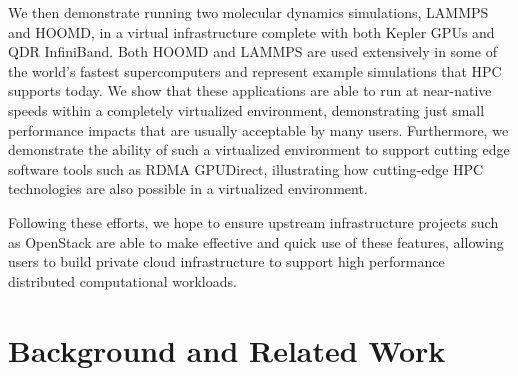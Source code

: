 We then demonstrate running two molecular dynamics simulations, LAMMPS and HOOMD, in a virtual infrastructure complete with both Kepler GPUs and QDR InfiniBand.  Both HOOMD and LAMMPS are used extensively in some of the world's fastest supercomputers and represent example simulations that HPC supports today.  We show that these applications are able to run at near-native speeds within a completely virtualized environment, demonstrating just small performance impacts that are usually acceptable by many users. Furthermore, we demonstrate the ability of such a virtualized environment to support cutting edge software tools such as RDMA GPUDirect, illustrating how cutting-edge HPC technologies are also possible in a virtualized environment. 

Following these efforts, we hope to ensure upstream infrastructure projects such as OpenStack \cite{www-Openstack, pepple2011deploying} are able to make effective and quick use of these features, allowing users to build private cloud infrastructure to support high performance distributed computational workloads. 





 


\section{Background and Related Work}


